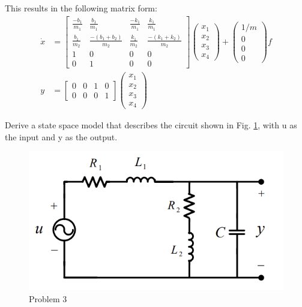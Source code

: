 \documentclass[11pt]{article}
\begin{document}
This results in the following matrix form:
\begin{align}
    \dot{x} &= \begin{bmatrix}
        \frac{-b_1}{m_1} & \frac{b_1}{m_1} & \frac{-k_1}{m_1} & \frac{k_1}{m_1} \\
        \frac{b_1}{m_2} & \frac{-(b_1 + b_2)}{m_2} & \frac{k_1}{m_2} & \frac{-(k_1 + k_2)}{m_2} \\
        1 & 0 & 0 & 0\\
        0 & 1 & 0 & 0
    \end{bmatrix} \begin{pmatrix}
        x_1 \\ x_2 \\ x_3 \\ x_4
    \end{pmatrix} + \begin{pmatrix}
        1/m \\ 0 \\ 0 \\ 0
    \end{pmatrix} f \\
    y &= \begin{bmatrix}
        0 & 0 & 1 & 0 \\ 0 & 0 & 0 & 1
    \end{bmatrix}\begin{pmatrix}
        x_1 \\ x_2 \\ x_3 \\ x_4
    \end{pmatrix}
\end{align}


Derive a state space model that describes the circuit shown in Fig. \ref{fig:p3}, with
u as the input and y as the output.

\begin{figure}[h] 
    \centering
    \includegraphics[width=0.55 \linewidth]{p3}
    \caption{Problem 3}
    \label{fig:p3}
\end{figure}

\soln
\end{document}
